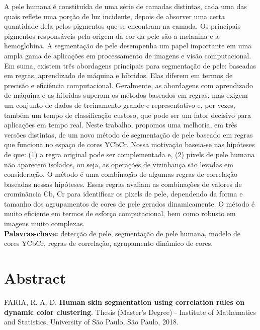 \documentclass[12pt,twoside,a4paper]{book}
\theoremstyle{plain}
\theoremstyle{definition}
\begin{document}
A pele humana é constituída de uma série de camadas distintas, cada uma das quais reflete uma porção de luz incidente, depois de absorver uma certa quantidade dela pelos pigmentos que se encontram na camada. Os principais pigmentos responsáveis pela origem da cor da pele são a melanina e a hemoglobina. A segmentação de pele desempenha um papel importante em uma ampla gama de aplicações em processamento de imagens e visão computacional. Em suma, existem três abordagens principais para segmentação de pele: baseadas em regras, aprendizado de máquina e híbridos. Elas diferem em termos de precisão e eficiência computacional. Geralmente, as abordagens com aprendizado de máquina e as híbridas superam os métodos baseados em regras, mas exigem um conjunto de dados de treinamento grande e representativo e, por vezes, também um tempo de classificação custoso, que pode ser um fator decisivo para aplicações em tempo real. Neste trabalho, propomos uma melhoria, em três versões distintas, de um novo método de segmentação de pele baseado em regras que funciona no espaço de cores YCbCr. Nossa motivação baseia-se nas hipóteses de que: (1) a regra original pode ser complementada e, (2) pixels de pele humana não aparecem isolados, ou seja, as operações de vizinhança são levadas em consideração. O método é uma combinação de algumas regras de correlação baseadas nessas hipóteses. Essas regras avaliam as combinações de valores de crominância Cb, Cr para identificar os pixels de pele, dependendo da forma e tamanho dos agrupamentos de cores de pele gerados dinamicamente. O método é muito eficiente em termos de esforço computacional, bem como robusto em imagens muito complexas.
\\

\noindent \textbf{Palavras-chave:} detecção de pele, segmentação de pele humana, modelo de cores YCbCr, regras de correlação, agrupamento dinâmico de cores.

\chapter*{Abstract}
\noindent FARIA, R. A. D. \textbf{Human skin segmentation using correlation rules on dynamic color clustering}.
Thesis (Master's Degree) - Institute of Mathematics and Statistics,
University of São Paulo, São Paulo, 2018.
\\
\end{document}
